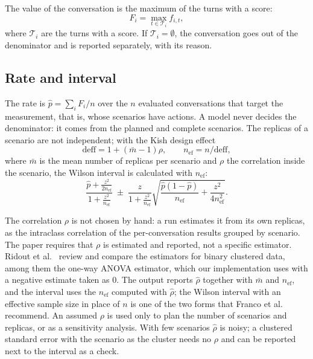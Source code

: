 \documentclass[11pt,a4paper]{article}
\begin{document}
The value of the conversation is the maximum of the turns with a score:
\begin{equation}
  F_i = \max_{t \in \mathcal{T}_i} f_{i,t},
\end{equation}
where $\mathcal{T}_i$ are the turns with a score. If $\mathcal{T}_i = \emptyset$, the conversation goes out of the
denominator and is reported separately, with its reason.

\subsection{Rate and interval}

The rate is $\hat{p} = \sum_i F_i / n$ over the $n$ evaluated conversations that target the measurement, that is,
whose scenarios have actions. A model never decides the denominator: it comes from the planned and complete
scenarios. The replicas of a scenario are not independent; with the Kish design effect
\begin{equation}
  \mathrm{deff} = 1 + (\bar{m} - 1)\rho, \qquad n_{\mathrm{ef}} = n / \mathrm{deff},
\end{equation}
where $\bar{m}$ is the mean number of replicas per scenario and $\rho$ the correlation inside the scenario, the
Wilson interval is calculated with $n_{\mathrm{ef}}$:
\begin{equation}
  \frac{\hat{p} + \frac{z^2}{2n_{\mathrm{ef}}}}{1 + \frac{z^2}{n_{\mathrm{ef}}}}
  \;\pm\;
  \frac{z}{1 + \frac{z^2}{n_{\mathrm{ef}}}}\sqrt{\frac{\hat{p}(1-\hat{p})}{n_{\mathrm{ef}}} + \frac{z^2}{4n_{\mathrm{ef}}^2}}.
\end{equation}

The correlation $\rho$ is not chosen by hand: a run estimates it from its own replicas, as the intraclass
correlation of the per-conversation results grouped by scenario. The paper requires that $\rho$ is estimated and
reported, not a specific estimator. Ridout et al.~\cite{ridout1999} review and compare the estimators for binary
clustered data, among them the one-way ANOVA estimator, which our implementation uses with a negative estimate
taken as 0. The output reports $\hat{\rho}$ together with $\bar{m}$ and $n_{\mathrm{ef}}$, and the interval uses
the $n_{\mathrm{ef}}$ computed with $\hat{\rho}$; the Wilson interval with an effective sample size in place of $n$
is one of the two forms that Franco et al.~\cite{franco2019} recommend. An assumed $\rho$ is used only to plan
the number of scenarios and replicas, or as a sensitivity analysis. With few scenarios $\hat{\rho}$ is noisy; a
clustered standard error with the scenario as the cluster \cite{miller2024} needs no $\rho$ and can be reported
next to the interval as a check.
\end{document}
